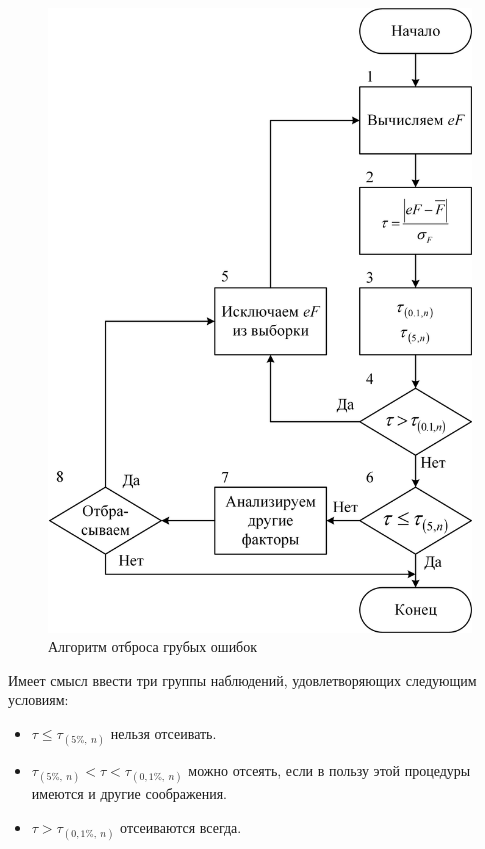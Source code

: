 	\begin{figure}[!ht]
		\centering
		\includegraphics[scale=1]{images/DropGrossError}
		\caption{Алгоритм отброса грубых ошибок} 
		\label{fig:AlgDGE}  
	\end{figure}

	Имеет смысл ввести три группы наблюдений, удовлетворяющих следующим условиям:
	\begin{itemize}
		\item $ \tau \leqslant \tau_{(5\%,\ n)} $ нельзя отсеивать.
		\item $ \tau_{(5\%,\ n)} < \tau < \tau_{(0,1\%,\ n)} $ можно отсеять, если в пользу этой процедуры имеются и другие соображения.
		\item $ \tau > \tau_{(0,1\%,\ n)} $ отсеиваются всегда.
	\end{itemize}

